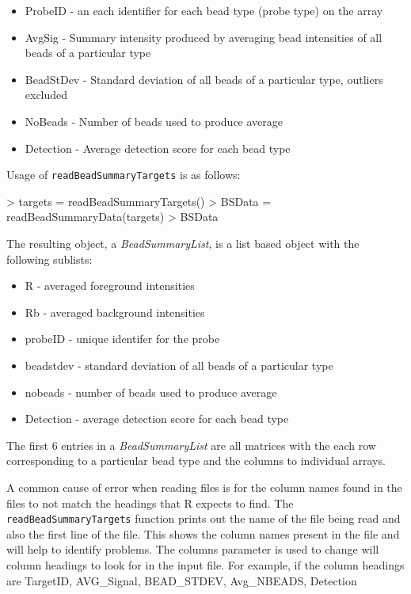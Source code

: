 \documentclass[a4paper]{article}
\newcommand{\Rfunction}[1]{{\texttt{#1}}}
\newcommand{\Rclass}[1]{{\textit{#1}}}
\begin{document}
\begin{itemize}
\item{ProbeID - an each identifier for each bead type (probe type) on the array}
\item{AvgSig - Summary intensity produced by averaging bead intensities of all beads of a particular type}
\item{BeadStDev - Standard deviation of all beads of a particular type, outliers excluded}
\item{NoBeads - Number of beads used to produce average}
\item{Detection - Average detection score for each bead type}
\end{itemize}

Usage of \Rfunction{readBeadSummaryTargets} is as follows:

\begin{Schunk}
\begin{Sinput}
> targets = readBeadSummaryTargets()
> BSData = readBeadSummaryData(targets)
> BSData
\end{Sinput}
\end{Schunk}


The resulting object, a \Rclass{BeadSummaryList}, is a list based object with the following sublists: 

\begin{itemize}
\item{R - averaged foreground intensities}
\item{Rb - averaged background intensities}
\item{probeID - unique identifer for the probe}
\item{beadstdev - standard deviation of all beads of a particular type}
\item{nobeads - number of beads used to produce average}
\item{Detection - average detection score for each bead type}

\end{itemize}

The first 6 entries in a \Rclass{BeadSummaryList} are all matrices with the each row corresponding to a particular bead type and the columns to individual arrays.

A common cause of error when reading files is for the column names found in the files to not match the headings that {\sf R} expects to find. The \Rfunction{readBeadSummaryTargets} function prints out the name of the file being read and also the first line of the file. 
This shows the column names present in the file and will help to
identify problems. The columns parameter is used to change will column
headings to look for in the input file. For example, if the column
headings are TargetID, AVG_Signal, BEAD_STDEV, Avg_NBEADS, Detection
\end{document}
